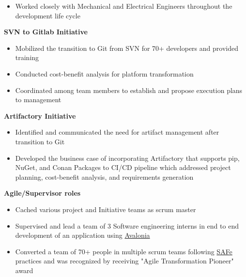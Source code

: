 \begin{cventries}
{\begin{cvitems}
{\begin{itemize}
        \item Worked closely with Mechanical and Electrical Engineers throughout the development life cycle 
    \end{itemize} 
}
\item 
{
    \textbf{SVN to Gitlab Initiative} 
    \begin{itemize}
        \item Mobilized the transition to Git from SVN for 70+ developers and provided training
        \item Conducted cost-benefit analysis for platform transformation 
        \item Coordinated among team members to establish and propose execution plans to management 
    \end{itemize} 
}
\item 
{
    \textbf{Artifactory Initiative}
    \begin{itemize}
        \item Identified and communicated the need for artifact management after transition to Git
        \item Developed the business case of incorporating Artifactory that supports pip, NuGet, and Conan Packages to CI/CD pipeline which addressed 
        project planning, cost-benefit analysis, and requirements generation
    \end{itemize} 
}
\item 
{
    \textbf{Agile/Supervisor roles} 
    \begin{itemize}
        \item Cached various project and Initiative teams as scrum master 
        \item Supervised and lead a team of 3 Software engineering interns in end to end development of an application using \href{https://avaloniaui.net/}{\color{RoyalBlue}Avalonia}
        \item Converted a team of 70+ people in multiple scrum teams following \href{https://www.scaledagileframework.com/}{\color{RoyalBlue}SAFe} practices and was
        recognized by receiving "Agile Transformation Pioneer" award
    \end{itemize} 
}
\end{cvitems}
}




\end{cventries}
